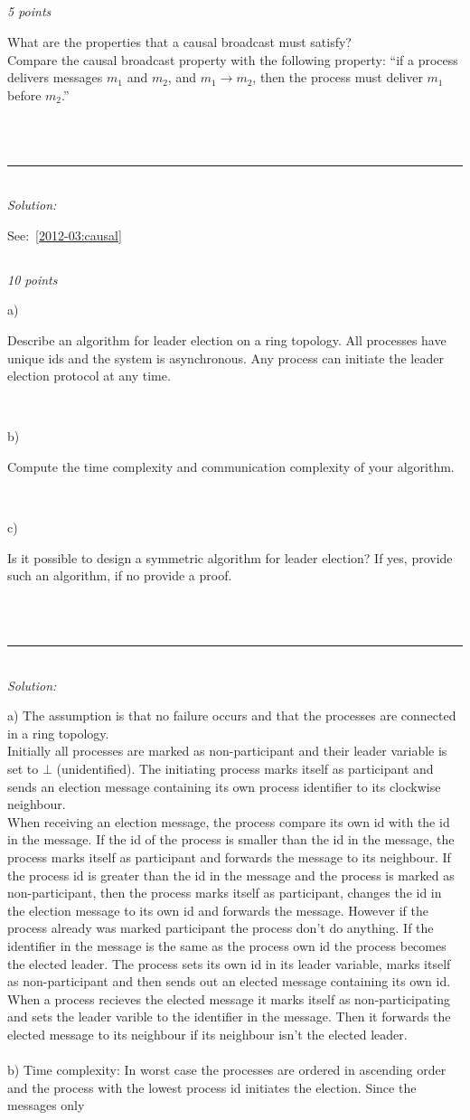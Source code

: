 \documentclass[a4paper]{article}
\newcommand{\horrule}[1]{\rule{\linewidth}{#1}} %
\newcommand{\points}[1]{\subsection{} \textit{#1 points}\\}
\newcommand{\question}[2][]{
  \noindent
  \parbox[t]{\textwidth}{#1 \parbox[t]{0.95\textwidth}{#2}}\\
}
\newcommand{\solution}[1]{\\\horrule{0.5pt}\\[3pt]\textit{Solution: }\\[0.1cm]\begin{minipage}{\textwidth}#1\end{minipage}}
\begin{document}
%
%
\points{5}
\question{
  What are the properties that a causal broadcast must satisfy? \\
  Compare the causal broadcast property with the following property:
  ``if a process delivers messages $m_1$ and $m_2$, and $m_1 \rightarrow
  m_2$, then the process must deliver $m_1$ before $m_2$.''
}
\solution{See:~\ref{2012-03:causal}}
%
\points{10}
\question[a)]{
  Describe an algorithm for leader election on a ring topology. All
  processes have unique ids and the system is asynchronous. Any process
  can initiate the leader election protocol at any time.
}
\question[b)]{
Compute the time complexity and communication complexity of
  your algorithm.
}
\question[c)]{
  Is it possible to design a symmetric algorithm for leader
  election? If yes, provide such an algorithm, if no provide a proof.
}
%
\solution{
a) The assumption is that no failure occurs and that the processes are
  connected in a ring topology. \\
  Initially all processes are marked as non-participant and their leader
  variable is set to $\bot$ (unidentified). The initiating process marks
  itself as participant and sends an election message containing its 
  own process identifier to its clockwise neighbour. \\
  When receiving an election message, the process compare its own id with
  the id in the message. If the id of the process is smaller than the id
  in the message, the process marks itself as participant and forwards the
  message to its neighbour. If the process id is greater than the id in the
  message and the process is marked as non-participant, then the process
  marks itself as participant, changes the id in the election message to 
  its own id and forwards the message. However if the process already was 
  marked participant the process don't do anything. If the identifier in 
  the message is the same as the process own id the process becomes the 
  elected leader. The process sets its own id in its leader variable, marks
  itself as non-participant and then sends out an elected message containing
  its own id. When a process recieves the elected message it marks itself
  as non-participating and sets the leader varible to the identifier in 
  the message. Then it forwards the elected message to its neighbour if its
  neighbour isn't the elected leader. \\ \\
  b) Time complexity: 
  In worst case the processes are ordered in ascending order and the process
  with the lowest process id initiates the election. Since the messages only
}
\end{document}
